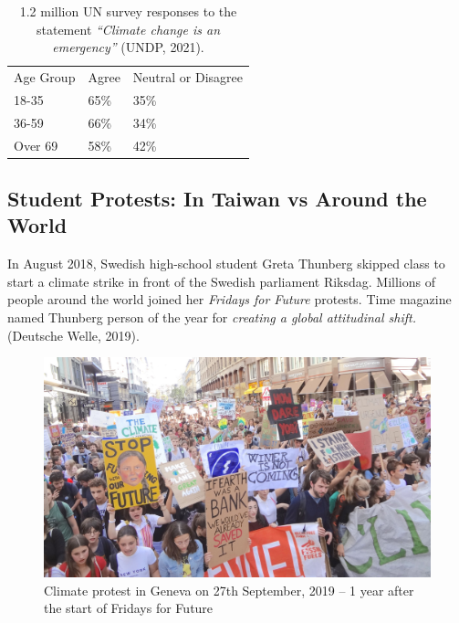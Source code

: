 \documentclass[
  letterpaper,
  DIV=11,
  numbers=noendperiod]{scrartcl}
\begin{document}
\begin{longtable}[]{@{}lll@{}}
\caption{1.2 million UN survey responses to the statement
\emph{``Climate change is an emergency''} (UNDP, 2021).}\tabularnewline
\toprule\noalign{}
\endfirsthead
\endhead
\bottomrule\noalign{}
\endlastfoot
Age Group & Agree & Neutral or Disagree \\
18-35 & 65\% & 35\% \\
36-59 & 66\% & 34\% \\
Over 69 & 58\% & 42\% \\
\end{longtable}

\subsection{Student Protests: In Taiwan vs Around the
World}\label{student-protests-in-taiwan-vs-around-the-world}

In August 2018, Swedish high-school student Greta Thunberg skipped class
to start a climate strike in front of the Swedish parliament Riksdag.
Millions of people around the world joined her \emph{Fridays for Future}
protests. Time magazine named Thunberg person of the year for
\emph{creating a global attitudinal shift.} (Deutsche Welle, 2019).

\begin{figure}[H]

{\centering \includegraphics[width=1\linewidth,height=\textheight,keepaspectratio]{./images/college/geneve.jpg}

}

\caption{Climate protest in Geneva on 27th September, 2019 -- 1 year
after the start of Fridays for Future}

\end{figure}%
\end{document}
